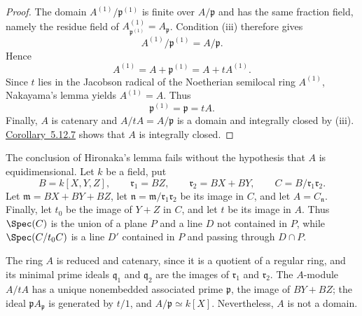 \begin{proof}
The domain $A^{(1)}/\mathfrak p^{(1)}$ is finite over
$A/\mathfrak p$ and has the same fraction field, namely the
residue field of
$A^{(1)}_{\mathfrak p^{(1)}}=A_{\mathfrak p}$.  Condition
{\rm(iii)} therefore gives
\[
  A^{(1)}/\mathfrak p^{(1)}=A/\mathfrak p.
\]
Hence
\[
  A^{(1)}=A+\mathfrak p^{(1)}=A+tA^{(1)}.
\]
Since $t$ lies in the Jacobson radical of the Noetherian
semilocal ring $A^{(1)}$, Nakayama's lemma yields
$A^{(1)}=A$.  Thus
\[
  \mathfrak p^{(1)}=\mathfrak p=tA.
\]
Finally, $A$ is catenary and
$A/tA=A/\mathfrak p$ is a domain and integrally closed by
{\rm(iii)}.  {\hyperlink{ega4.c04.cor.5-12-7}{Corollary~5.12.7}} shows that $A$ is integrally
closed.
\end{proof}

\begin{remark}[5.12.9]
\label{IV.5.12.9}
The conclusion of Hironaka's lemma fails without the hypothesis
that $A$ is equidimensional.  Let $k$ be a field, put
\[
  B=k[X,Y,Z],\qquad
  \mathfrak r_1=BZ,\qquad
  \mathfrak r_2=BX+BY,\qquad
  C=B/\mathfrak r_1\mathfrak r_2.
\]
Let $\mathfrak m=BX+BY+BZ$, let
$\mathfrak n=\mathfrak m/\mathfrak r_1\mathfrak r_2$ be its
image in $C$, and let $A=C_{\mathfrak n}$.  Finally, let $t_0$
be the image of $Y+Z$ in $C$, and let $t$ be its image in $A$.
Thus $\Spec(C)$ is the union of a plane $P$ and a line $D$ not
contained in $P$, while $\Spec(C/t_0C)$ is a line $D'$ contained
in $P$ and passing through $D\cap P$.

The ring $A$ is reduced and catenary, since it is a quotient of a
regular ring, and its minimal prime ideals $\mathfrak q_1$ and
$\mathfrak q_2$ are the images of $\mathfrak r_1$ and
$\mathfrak r_2$.  The $A$-module $A/tA$ has a unique
nonembedded associated prime $\mathfrak p$, the image of
$BY+BZ$; the ideal $\mathfrak pA_{\mathfrak p}$ is generated by
$t/1$, and $A/\mathfrak p\simeq k[X]$.  Nevertheless, $A$ is
not a domain.
\end{remark}

